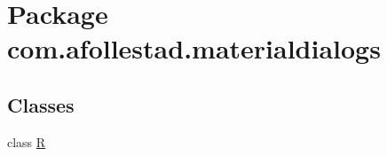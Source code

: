 \hypertarget{namespacecom_1_1afollestad_1_1materialdialogs}{}\section{Package com.\+afollestad.\+materialdialogs}
\label{namespacecom_1_1afollestad_1_1materialdialogs}
\subsection*{Classes}
\begin{DoxyCompactItemize}
\item 
class \hyperlink{classcom_1_1afollestad_1_1materialdialogs_1_1_r}{R}
\end{DoxyCompactItemize}
